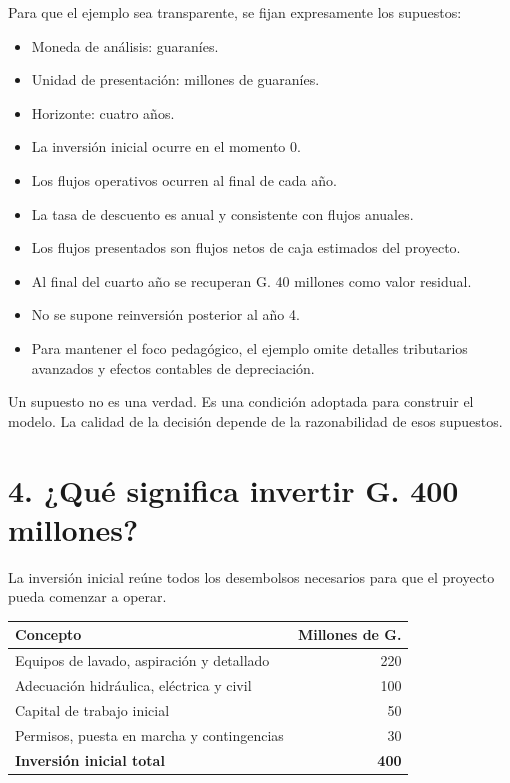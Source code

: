 \documentclass[11pt,a4paper]{article}
\begin{document}
Para que el ejemplo sea transparente, se fijan expresamente los supuestos:

\begin{itemize}
\item Moneda de análisis: guaraníes.
\item Unidad de presentación: millones de guaraníes.
\item Horizonte: cuatro años.
\item La inversión inicial ocurre en el momento 0.
\item Los flujos operativos ocurren al final de cada año.
\item La tasa de descuento es anual y consistente con flujos anuales.
\item Los flujos presentados son flujos netos de caja estimados del proyecto.
\item Al final del cuarto año se recuperan G. 40 millones como valor residual.
\item No se supone reinversión posterior al año 4.
\item Para mantener el foco pedagógico, el ejemplo omite detalles tributarios avanzados y efectos contables de depreciación.
\end{itemize}

\begin{nota}
Un supuesto no es una verdad. Es una condición adoptada para construir el modelo. La calidad de la decisión depende de la razonabilidad de esos supuestos.
\end{nota}

\section*{4. ¿Qué significa invertir G. 400 millones?}

La inversión inicial reúne todos los desembolsos necesarios para que el proyecto pueda comenzar a operar.

\begin{center}
\begin{tabularx}{0.88\textwidth}{Xr}
\toprule
\textbf{Concepto} & \textbf{Millones de G.}\\
\midrule
Equipos de lavado, aspiración y detallado & 220\\
Adecuación hidráulica, eléctrica y civil & 100\\
Capital de trabajo inicial & 50\\
Permisos, puesta en marcha y contingencias & 30\\
\midrule
\textbf{Inversión inicial total} & \textbf{400}\\
\bottomrule
\end{tabularx}
\end{center}
\end{document}
